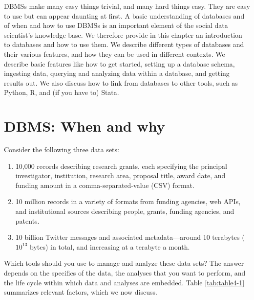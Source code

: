 \documentclass[]{krantz}
\begin{document}
DBMSs make many easy things trivial, and many hard things easy. They are
easy to use but can appear daunting at first. A basic understanding of
databases and of when and how to use DBMSs is an important element of
the social data scientist's knowledge base. We therefore provide in this
chapter an introduction to databases and how to use them. We describe
different types of databases and their various features, and how they
can be used in different contexts. We describe basic features like how
to get started, setting up a database schema, ingesting data, querying
and analyzing data within a database, and getting results out. We also
discuss how to link from databases to other tools, such as Python, R,
and (if you have to) Stata.

\hypertarget{sec:db:when}{\section{DBMS: When and
why}\label{sec:db:when}}

Consider the following three data sets:

\begin{enumerate}
\def\labelenumi{\arabic{enumi}.}
\item
  10,000 records describing research grants, each specifying the
  principal investigator, institution, research area, proposal title,
  award date, and funding amount in a comma-separated-value (CSV)
  format.
\item
  10 million records in a variety of formats from funding agencies, web
  APIs, and institutional sources describing people, grants, funding
  agencies, and patents.
\item
  10 billion Twitter messages and associated metadata---around 10
  terabytes (\(10^{13}\) bytes) in total, and increasing at a terabyte a
  month.
\end{enumerate}

Which tools should you use to manage and analyze these data sets? The
answer depends on the specifics of the data, the analyses that you want
to perform, and the life cycle within which data and analyses are
embedded. Table \ref{tab:table4-1} summarizes relevant factors, which we
now discuss.
\end{document}
